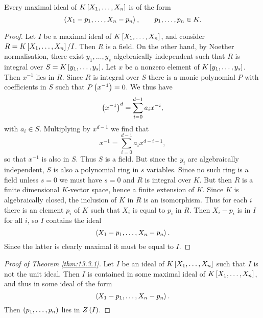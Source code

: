 \begin{corollary}
Every maximal ideal of $ K\sb{X_1, \dots, X_n} $ is of the form
$$ \ab{X_1 - p_1, \dots, X_n - p_n} , \qquad p_1, \dots, p_n \in K. $$
\end{corollary}

\begin{proof}
Let $ I $ be a maximal ideal of $ K\sb{X_1, \dots, X_n} $, and consider $ R = K\sb{X_1, \dots, X_n} / I $. Then $ R $ is a field. On the other hand, by Noether normalisation, there exist $ y_1, \dots, y_s $ algebraically independent such that $ R $ is integral over $ S = K\sb{y_1, \dots, y_s} $. Let $ x $ be a nonzero element of $ K\sb{y_1, \dots, y_s} $. Then $ x^{-1} $ lies in $ R $. Since $ R $ is integral over $ S $ there is a monic polynomial $ P $ with coefficients in $ S $ such that $ P\rb{x^{-1}} = 0 $. We thus have
$$ \rb{x^{-1}}^d = \sum_{i = 0}^{d - 1} a_ix^{-i}, $$
with $ a_i \in S $. Multiplying by $ x^{d - 1} $ we find that
$$ x^{-1} = \sum_{i = 0}^{d - 1} a_ix^{d - i - 1}, $$
so that $ x^{-1} $ is also in $ S $. Thus $ S $ is a field. But since the $ y_i $ are algebraically independent, $ S $ is also a polynomial ring in $ s $ variables. Since no such ring is a field unless $ s = 0 $ we must have $ s = 0 $ and $ R $ is integral over $ K $. But then $ R $ is a finite dimensional $ K $-vector space, hence a finite extension of $ K $. Since $ K $ is algebraically closed, the inclusion of $ K $ in $ R $ is an isomorphism. Thus for each $ i $ there is an element $ p_i $ of $ K $ such that $ X_i $ is equal to $ p_i $ in $ R $. Then $ X_i - p_i $ is in $ I $ for all $ i $, so $ I $ contains the ideal
$$ \ab{X_1 - p_1, \dots, X_n - p_n}. $$
Since the latter is clearly maximal it must be equal to $ I $.
\end{proof}

\begin{proof}[Proof of Theorem \ref{thm:13.3.1}]
Let $ I $ be an ideal of $ K\sb{X_1, \dots, X_n} $ such that $ I $ is not the unit ideal. Then $ I $ is contained in some maximal ideal of $ K\sb{X_1, \dots, X_n} $, and thus in some ideal of the form
$$ \ab{X_1 - p_1, \dots, X_n - p_n}. $$
Then $ \rb{p_1, \dots, p_n} $ lies in $ Z\rb{I} $.
\end{proof}

